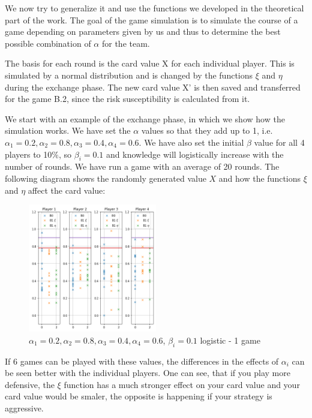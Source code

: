 We now try to generalize it and use the functions we developed in the theoretical part of the work. The goal of the game simulation is to simulate the course of a game depending on parameters given by us and thus to determine the best possible combination of $\alpha$ for the team.

The basis for each round is the card value X for each individual player. This is simulated by a normal distribution and is changed by the functions $\xi$ and $\eta$ during the exchange phase. The new card value X' is then saved and transferred for the game B.2, since the risk susceptibility is calculated from it.

We start with an example of the exchange phase, in which we show how the simulation works. We have set the $\alpha$ values so that they add up to 1, i.e. $\alpha_1=0.2,\alpha_2=0.8,\alpha_3=0.4,\alpha_4=0.6$. We have also set the initial $\beta$ value for all 4 players to 10$\%$, so $\beta_i=0.1$ and knowledge will logistically increase with the number of rounds. We have run a game with an average of 20 rounds. The following diagram shows the randomly generated value $X$ and how the functions $\xi$ and $\eta$ affect the card value:

\begin{figure}[!ht]
    \centering
    \includegraphics[width=0.5\textwidth]{Bilder/example_1}
    \caption{$\alpha_1=0.2,\alpha_2=0.8,\alpha_3=0.4,\alpha_4=0.6$, $\beta_i=0.1$ logistic - 1 game}
    \label{fig:meine-grafik}
\end{figure}

If 6 games can be played with these values, the differences in the effects of $\alpha_i$ can be seen better with the individual players. One can see, that if you play more defensive, the $\xi$ function has a much stronger effect on your card value and your card value would be smaler, the opposite is happening if your strategy is aggressive.

